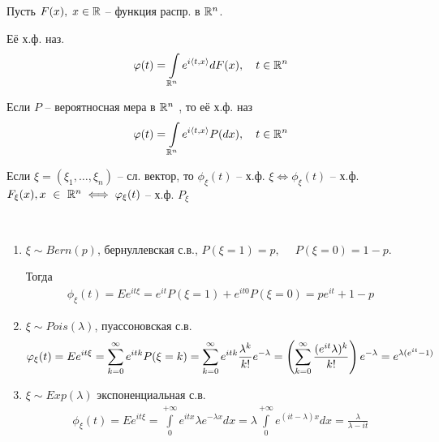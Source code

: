 \begin{definition}
  Пусть $F(x), \; x \in \mathbb{R}$ -- функция распр. в $\mathbb{R}^n$.

  Её х.ф. наз.
  \begin{align*}
    \varphi(t) = \int\limits_{\mathbb{R}^n} e^{i \langle t, x \rangle} dF(x),\quad t \in \mathbb{R}^n
  \end{align*}

  Если $P$ -- вероятносная мера в $\mathbb{R}^n$ , то её х.ф. наз
  \begin{align*}
    \varphi(t) = \int\limits_{\mathbb{R}^n} e^{i \langle t, x \rangle} P(dx),\quad t \in \mathbb{R}^n
  \end{align*}
\end{definition}

\begin{corollary}
  Если $\xi = (\xi_1, \ldots, \xi_n)$ -- сл. вектор, то
  $\phi_\xi(t)$ -- х.ф. $\xi \iff \phi_\xi(t)$ -- х.ф. $F_\xi (x), x~\in~\mathbb{R}^n
  \iff \varphi_\xi (t)$ -- х.ф. $P_\xi$
\end{corollary}

\begin{example}~
  \begin{enumerate}
    \item
      $\xi \sim Bern(p)$, бернуллевская с.в.,
      $P(\xi = 1) = p,\quad \; P(\xi = 0) = 1 - p$.

      Тогда 
      \begin{align*}
        \phi_\xi (t) = E e^{i t \xi} = e^{i t} P (\xi = 1) + e^{i t 0} P(\xi = 0) 
        = p e^{it} + 1 - p
      \end{align*}

    \item
      $\xi \sim Pois(\lambda)$, пуассоновская с.в.
      \begin{align*}
        \varphi_\xi (t) = E e^{i t \xi} = \sum_{k = 0}^{\infty} e^{i t k} P(\xi = k) 
        = \sum_{k = 0}^{\infty} e^{i t k} \frac{\lambda^k}{k!} e^{-\lambda} 
        = \left( \sum_{k = 0}^{\infty} \frac{(e^{i t} \lambda)^k}{k!} \right) e^{-\lambda}
        = e^{\lambda(e^{it} - 1)}
      \end{align*}

    \item
      $\xi \sim Exp(\lambda)$ экспоненциальная с.в.
      \begin{align*}
        \phi_\xi (t) = E e^{i t \xi} = \int\limits_{0}^{+\infty} e^{i t x} \lambda e^{-\lambda x} dx 
        = \lambda \int\limits_{0}^{+\infty} e^{(it - \lambda) x} dx = \frac{\lambda}{\lambda - i t}
      \end{align*}
  \end{enumerate}
\end{example}

